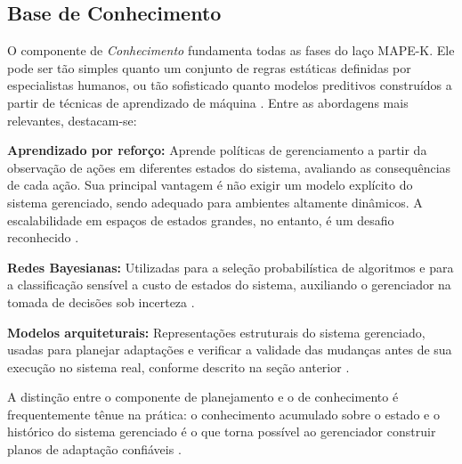 \subsection{Base de Conhecimento}
\label{subsec:conhecimento}

O componente de \textit{Conhecimento} fundamenta todas as fases do laço MAPE-K. Ele pode ser tão simples quanto um conjunto de regras estáticas definidas por especialistas humanos, ou tão sofisticado quanto modelos preditivos construídos a partir de técnicas de aprendizado de máquina \cite{W1999392360, lalanda2013}. Entre as abordagens mais relevantes, destacam-se:

\textbf{Aprendizado por reforço:} Aprende políticas de gerenciamento a partir da observação de ações em diferentes estados do sistema, avaliando as consequências de cada ação. Sua principal vantagem é não exigir um modelo explícito do sistema gerenciado, sendo adequado para ambientes altamente dinâmicos. A escalabilidade em espaços de estados grandes, no entanto, é um desafio reconhecido \cite{W1999392360}.

\textbf{Redes Bayesianas:} Utilizadas para a seleção probabilística de algoritmos e para a classificação sensível a custo de estados do sistema, auxiliando o gerenciador na tomada de decisões sob incerteza \cite{W1999392360}.

\textbf{Modelos arquiteturais:} Representações estruturais do sistema gerenciado, usadas para planejar adaptações e verificar a validade das mudanças antes de sua execução no sistema real, conforme descrito na seção anterior \cite{W1999392360, lalanda2013}.

A distinção entre o componente de planejamento e o de conhecimento é frequentemente tênue na prática: o conhecimento acumulado sobre o estado e o histórico do sistema gerenciado é o que torna possível ao gerenciador construir planos de adaptação confiáveis \cite{W1999392360}.
